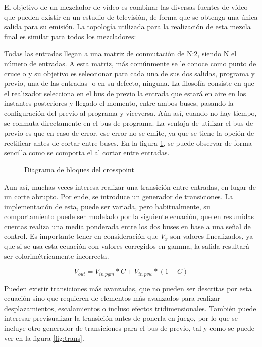 \documentclass[../main.tex]{subfiles}
\begin{document}
El objetivo de un mezclador de vídeo es combinar las diversas fuentes de vídeo que pueden existir en un estudio de televisión, de forma que se obtenga una única salida para su emisión. La topología utilizada para la realización de esta mezcla final es similar para todos los mezcladores:\newline

Todas las entradas llegan a una matriz de conmutación de N:2, siendo N el número de entradas. A esta matriz, más comúnmente se le conoce como punto de cruce o  y su objetivo es seleccionar para cada una de sus dos salidas, programa y previo, una de las entradas -o en su defecto, ninguna. La filosofía consiste en que el realizador selecciona en el bus de previo la entrada que estará en aire en los instantes posteriores y llegado el momento,  entre ambos buses, pasando la configuración del previo al programa y viceversa. Aún así, cuando no hay tiempo, se conmuta directamente en el bus de programa. La ventaja de utilizar el bus de previo es que en caso de error, ese error no se emite, ya que se tiene la opción de rectificar antes de cortar entre buses. En la figura \ref{fig:xpt}, se puede observar de forma sencilla como se comporta el  al cortar entre entradas.\newline



\begin{figure}[H]
    \centering

    \caption{Diagrama de bloques del crosspoint}
    \label{fig:xpt}
\end{figure}

Aun así, muchas veces interesa realizar una transición entre entradas, en lugar de un corte abrupto. Por ende, se introduce un generador de transiciones. La implementación de esta, puede ser variada, pero habitualmente, su comportamiento puede ser modelado por la siguiente ecuación, que en resumidas cuentas realiza una media ponderada entre los dos buses en base a una señal de control. Es importante tener en consideración que $V_{x}$ son valores linealizados, ya que si se usa esta ecuación con valores corregidos en gamma, la salida resultará ser colorimétricamente incorrecta.

$$V_{out} = V_{in\ pgm} * C + V_{in\ pvw} * (1 - C)$$

Pueden existir transiciones más avanzadas, que no pueden ser descritas por esta ecuación sino que requieren de elementos más avanzados para realizar desplazamientos, escalamientos o incluso efectos tridimensionales. También puede interesar previsualizar la transición antes de ponerla en juego, por lo que se incluye otro generador de transiciones para el bus de previo, tal y como se puede ver en la figura \ref{fig:trans}.\newline
\end{document}
